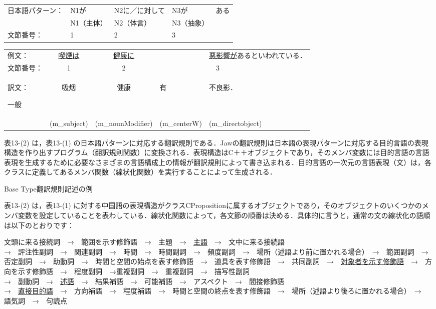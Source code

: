 \documentclass[japanese]{jnlp_1.4}
\begin{document}
\begin{tabular}{lllll}
日本語パターン：& N1が & N2に／に対して & N3が & ある\\
	& N1（主体）& N2（体言）& N3（抽象）& \\
文節番号：&1 & 2 & 3 
\end{tabular}

\begin{tabular}{lccll}
例文：& \ul{喫煙は} & \ul{健康に} & &  \parbox{11zw}{\ul{悪影響が}あるといわれている．}\\
文節番号：& 1 & 2 & & 　3 \\
訳文：\begin{簡体中文}一般\end{簡体中文} & \begin{簡体中文}吸烟\end{簡体中文} & \begin{簡体中文}健康\end{簡体中文} & \begin{簡体中文}有\end{簡体中文} & \begin{簡体中文}不良影．\end{簡体中文}\\
 & (m\_subject) & (m\_nounModifier) & (m\_centerW) & (m\_directobject)
\end{tabular}

表13-(2) は，表13-(1) の日本語パターンに対応する翻訳規則である．Jawの翻訳規則は日本語の表現パターンに対応する目的言語の表現構造を作り出すプログラム（翻訳規則関数）に変換される．表現構造はC＋＋オブジェクトであり，そのメンバ変数には目的言語の言語表現を生成するために必要なさまざまの言語構成上の情報が翻訳規則によって書き込まれる．目的言語の一次元の言語表現（文）は，各クラスに定義してあるメンバ関数（線状化関数）を実行することによって生成される．

\begin{table}[t]
\caption{Base Type翻訳規則記述の例}

\end{table}


表13-(2) は，表13-(1) に対する中国語の表現構造がクラスCPropositionに属するオブジェクトであり，そのオブジェクトのいくつかのメンバ変数を設定していることを表わしている．線状化関数によって，各文節の順番は決める．具体的に言うと，通常の文の線状化の語順は以下のとおりです：

{\setlength{\leftskip}{2zw}
\noindent
文頭に来る接続詞　→　範囲を示す修飾語　→　主題　→　\ul{主語}　→　文中に来る接続語\\
→　評注性副詞　→　関連副詞　→　時間　→　時間副詞　→　頻度副詞　→　場所（述語より前に置かれる場合）　→　範囲副詞　→　否定副詞　→　助動詞　→　時間と空間の始点を表す修飾語　→　道具を表す修飾語　→　共同副詞　→　\ul{対象者を示す修飾語}　→　方向を示す修飾語　→　程度副詞　→重複副詞　→　重複副詞　→　描写性副詞\\
→　副動詞　→　\ul{述語}　→　結果補語　→　可能補語　→　アスペクト　→　間接修飾語\\
→　\ul{直接目的語}　→　方向補語　→　程度補語　→　時間と空間の終点を表す修飾語　→　場所（述語より後ろに置かれる場合）　→　語気詞　→　句読点\par}
\end{document}
